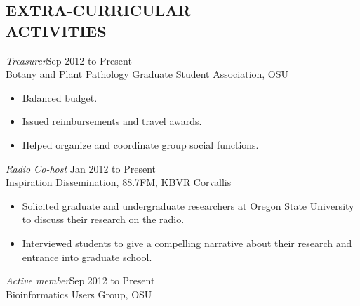 \documentclass[margin, 10pt]{res} %
\begin{document}
\begin{resume}

\section{EXTRA-CURRICULAR \\ ACTIVITIES} 

{\sl Treasurer}\hfill Sep 2012 to Present \\
Botany and Plant Pathology Graduate Student Association, OSU
\begin{itemize} \itemsep -2pt
\item Balanced budget.
\item Issued reimbursements and travel awards.
\item Helped organize and coordinate group social functions.
\end{itemize}


{\sl Radio Co-host} \hfill Jan 2012 to Present \\
Inspiration Dissemination, 88.7FM, KBVR Corvallis
\begin{itemize} \itemsep -2pt
\item Solicited graduate and undergraduate researchers at Oregon State University to discuss their research on the radio.
\item Interviewed students to give a compelling narrative about their research and entrance into graduate school.
\end{itemize}

{\sl Active member}\hfill Sep 2012 to Present \\
Bioinformatics Users Group, OSU


\end{resume}
\end{document}

